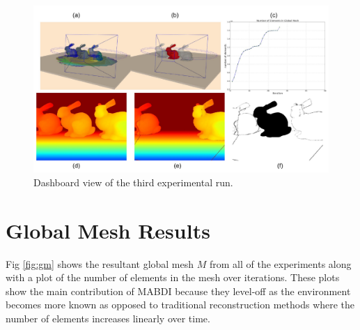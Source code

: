 \begin{figure}[h]%
\centering
  \includegraphics[width=\textwidth]{figures/diagram_run3.pdf}
  \caption{Dashboard view of the third experimental run.}
  \label{fig:run3}
\end{figure}

\section{Global Mesh Results}

Fig \ref{fig:gm} shows the resultant global mesh $M$ from all of the experiments along with
a plot of the number of elements in the mesh over iterations. These plots show
the main contribution of MABDI because they level-off as the environment becomes
more known as opposed to traditional reconstruction methods where the number of
elements increases linearly over time.

